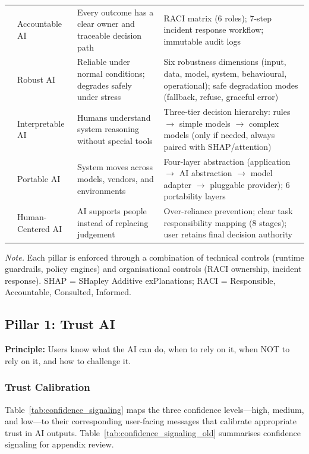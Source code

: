 {\begin{xltabular}{\textwidth}{@{} c l L L @{}}
 & Accountable AI & Every outcome has a clear owner and traceable decision path & RACI matrix (6 roles); 7-step incident response workflow; immutable audit logs \\
 & Robust AI & Reliable under normal conditions; degrades safely under stress & Six robustness dimensions (input, data, model, system, behavioural, operational); safe degradation modes (fallback, refuse, graceful error) \\
 & Interpretable AI & Humans understand system reasoning without special tools & Three-tier decision hierarchy: rules $\rightarrow$ simple models $\rightarrow$ complex models (only if needed, always paired with SHAP/attention) \\
 & Portable AI & System moves across models, vendors, and environments & Four-layer abstraction (application $\rightarrow$ AI abstraction $\rightarrow$ model adapter $\rightarrow$ pluggable provider); 6 portability layers \\
 & Human-Centered AI & AI supports people instead of replacing judgement & Over-reliance prevention; clear task responsibility mapping (8 stages); user retains final decision authority \\
\end{xltabular}}
\vspace{0.5em}\noindent\textit{Note.} Each pillar is enforced through a combination of technical controls (runtime guardrails, policy engines) and organisational controls (RACI ownership, incident response). SHAP = SHapley Additive exPlanations; RACI = Responsible, Accountable, Consulted, Informed.

\iffalse %

\subsection{Pillar 1: Trust AI}

\textbf{Principle:} Users know what the AI can do, when to rely on it, when NOT to rely on it, and how to challenge it.

\subsubsection{Trust Calibration}

Table~\ref{tab:confidence_signaling} maps the three confidence levels---high, medium, and low---to their corresponding user-facing messages that calibrate appropriate trust in AI outputs.
\noindent Table~\ref{tab:confidence_signaling_old} summarises confidence signaling for appendix review.

